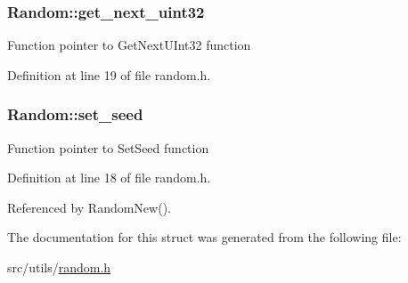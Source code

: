 \hypertarget{structRandom_af78a2d30ec06d4a719834ff02e9bc212}{
\subsubsection[{get\-\_\-next\-\_\-uint32}]{ {\bf \-Random\-::get\-\_\-next\-\_\-uint32}}}\label{d9/d46/structRandom_af78a2d30ec06d4a719834ff02e9bc212}
\-Function pointer to \-Get\-Next\-U\-Int32 function 

\-Definition at line 19 of file random.\-h.

\hypertarget{structRandom_a2c49b2f73e05709704aa1da53e968ff5}{
\subsubsection[{set\-\_\-seed}]{ {\bf \-Random\-::set\-\_\-seed}}}\label{d9/d46/structRandom_a2c49b2f73e05709704aa1da53e968ff5}
\-Function pointer to \-Set\-Seed function 

\-Definition at line 18 of file random.\-h.



\-Referenced by \-Random\-New().



\-The documentation for this struct was generated from the following file\-:\begin{DoxyCompactItemize}
\item 
src/utils/\hyperlink{random_8h}{random.\-h}\end{DoxyCompactItemize}
